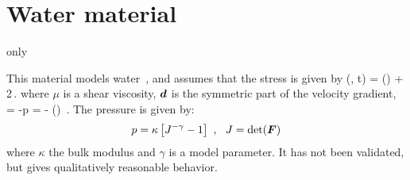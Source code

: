 \section{Water material}
  \MPM only

This material models water~\cite{water_model_ref}, and assumes that the stress is given by
\Beq
  \Bsig(\BF, t) = \pbar(\BF) \BI + 2\mu\,\Beta.
\Eeq
where $\mu$ is a shear viscosity, $\boldsymbol{d}$ is the symmetric part of the velocity gradient,
\Beq
  \pbar = -p \quad \Tand \quad \Beta = \BdT - \Third \Tr(\BdT) \BI \,.
\Eeq
The pressure is given by:
\begin{equation}
  p = \kappa\left[J^{-\gamma} - 1\right] ~,~~ J = \det(\boldsymbol{F})
\end{equation}
where $\kappa$ the bulk modulus and $\gamma$ is a model parameter.  
It has not been validated, but gives qualitatively reasonable behavior.
